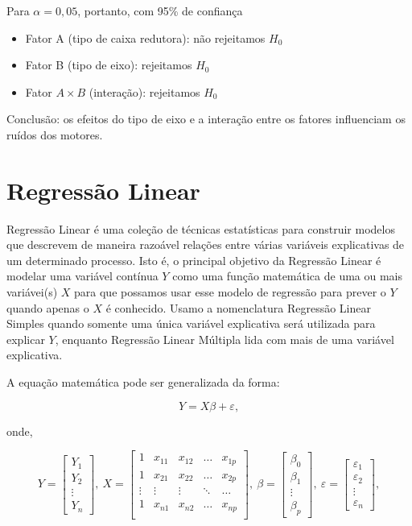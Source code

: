 \documentclass[
]{book}
\providecommand{\tightlist}{%
  \setlength{\itemsep}{0pt}\setlength{\parskip}{0pt}}
\begin{document}
Para \(\alpha = 0,05\), portanto, com 95\% de confiança

\begin{itemize}
\tightlist
\item
  Fator A (tipo de caixa redutora): não rejeitamos \(H_0\)
\item
  Fator B (tipo de eixo): rejeitamos \(H_0\)
\item
  Fator \(A\times B\) (interação): rejeitamos \(H_0\)
\end{itemize}

Conclusão: os efeitos do tipo de eixo e a interação entre os fatores influenciam os ruídos dos motores.

\hypertarget{regressuxe3o-linear}{%
\chapter{Regressão Linear}\label{regressuxe3o-linear}}

Regressão Linear é uma coleção de técnicas estatísticas para construir modelos que descrevem de maneira razoável relações entre várias variáveis explicativas de um determinado processo. Isto é, o principal objetivo da Regressão Linear é modelar uma variável contínua \(Y\) como uma função matemática de uma ou mais variávei(s) \(X\) para que possamos usar esse modelo de regressão para prever o \(Y\) quando apenas o \(X\) é conhecido. Usamo a nomenclatura Regressão Linear Simples quando somente uma única variável explicativa será utilizada para explicar \(Y\), enquanto Regressão Linear Múltipla lida com mais de uma variável explicativa.

A equação matemática pode ser generalizada da forma:

\[Y=X\beta+\varepsilon,\]

onde,

\[Y = \left[\begin{array}{r}
Y_1       \\
Y_2    \\
\vdots \\
Y_n    \end{array}\right], ~ X = \left[\begin{array}{rrrrr}
1 & x_{11} & x_{12} & \ldots & x_{1p} \\
1 & x_{21} & x_{22} & \ldots & x_{2p} \\
\vdots & \vdots & \vdots & \ddots & \ldots \\
1 & x_{n1} & x_{n2} & \ldots & x_{np} \\
\end{array}\right], ~ \beta = \left[\begin{array}{r}
\beta_0       \\
\beta_1    \\
\vdots \\
\beta_p    \end{array}\right], ~ \varepsilon = \left[\begin{array}{r}
\varepsilon_1       \\
\varepsilon_2    \\
\vdots \\
\varepsilon_n \end{array}\right],\]
\end{document}
